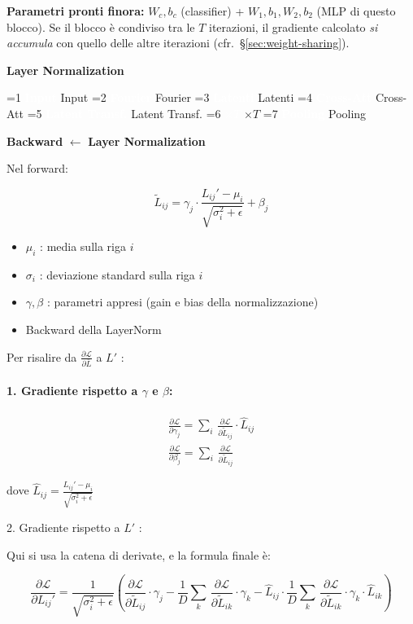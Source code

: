 \documentclass[
  11pt,
]{article}
\newcommand{\currentstep}[1]{%
\begin{tcolorbox}[colback=red!3, colframe=red!40!black, boxrule=0.3pt, arc=2pt,
  left=4pt, right=4pt, top=2pt, bottom=2pt]
{\footnotesize\textbf{Backward} $\longleftarrow$ \textbf{#1}}
\end{tcolorbox}}
\newcommand{\mystripchip}[3]{%
  \setlength{\fboxsep}{2.8pt}%
  \ifnum#3=#1\relax
    \colorbox{seccolor}{\textcolor{white}{\bfseries #2}}%
  \else
    \colorbox{seccolor!8}{\textcolor{seccolor!55}{#2}}%
  \fi}
\newcommand{\mystriparr}{{\fontsize{8}{8}\selectfont\;\textcolor{seccolor!45}{$\rightarrow$}\;}}
\newcommand{\mystrip}[1]{%
\begin{center}
{\sffamily\fontsize{7.5}{9}\selectfont
\mystripchip{1}{Input}{#1}\mystriparr\mystripchip{2}{Fourier}{#1}\mystriparr\mystripchip{3}{Latenti}{#1}\mystriparr%
\mystripchip{4}{Cross-Att}{#1}\mystriparr\mystripchip{5}{Latent Transf.}{#1}\mystriparr%
\mystripchip{6}{$\times T$}{#1}\mystriparr\mystripchip{7}{Pooling}{#1}}
\end{center}}
\renewcommand{\currentstep}[2][0]{%
\mystrip{#1}%
\begin{tcolorbox}[colback=red!3, colframe=red!40!black, boxrule=0.3pt, arc=2pt,
  left=4pt, right=4pt, top=2pt, bottom=2pt]
{\footnotesize\textbf{Backward} $\longleftarrow$ \textbf{#2}}
\end{tcolorbox}}
\begin{document}
\begin{notabox}[title={\textbf{Checkpoint gradienti --- fine MLP backward}}]
\medskip
\textbf{Parametri pronti finora:} $W_c, b_c$ (classifier) + $W_1, b_1, W_2, b_2$ (MLP di questo blocco). Se il blocco è condiviso tra le $T$ iterazioni, il gradiente calcolato \emph{si accumula} con quello delle altre iterazioni (cfr.\ \S\ref{sec:weight-sharing}).
\end{notabox}


\textbf{Layer Normalization}

\currentstep[5]{Layer Normalization}

Nel forward:

\[{\widetilde{L}}_{ij} = \gamma_{j} \cdot \frac{L_{ij}' - \mu_{i}}{\sqrt{\sigma_{i}^{2} + \epsilon}} + \beta_{j}\]

\begin{itemize}
\item
  \(\mu_{i}\) : media sulla riga \(i\)
\item
  \(\sigma_{i}\) : deviazione standard sulla riga \(i\)
\item
  \(\gamma,\beta\) : parametri appresi (gain e bias della
  normalizzazione)
\item
  Backward della LayerNorm
\end{itemize}

Per risalire da \(\frac{\partial\mathcal{L}}{\partial\bar{L}}\) a \(L'\)
:

\paragraph{1. Gradiente rispetto a $\gamma$ e $\beta$:}

\[\begin{matrix}
\frac{\partial\mathcal{L}}{\partial\gamma_{j}} = \sum_{i}^{}\,\frac{\partial\mathcal{L}}{\partial{\widetilde{L}}_{ij}} \cdot {\widehat{L}}_{ij} \\
\frac{\partial\mathcal{L}}{\partial\beta_{j}} = \sum_{i}^{}\,\frac{\partial\mathcal{L}}{\partial{\widetilde{L}}_{ij}}
\end{matrix}\]

dove
\({\widehat{L}}_{ij} = \frac{L_{ij}' - \mu_{i}}{\sqrt{\sigma_{i}^{2} + \epsilon}}\)

2. Gradiente rispetto a \(L'\) :

Qui si usa la catena di derivate, e la formula finale è:

\[\frac{\partial\mathcal{L}}{\partial L_{ij}'} = \frac{1}{\sqrt{\sigma_{i}^{2} + \epsilon}}\left( \frac{\partial\mathcal{L}}{\partial{\widetilde{L}}_{ij}} \cdot \gamma_{j} - \frac{1}{D}\sum_{k}^{}\,\frac{\partial\mathcal{L}}{\partial{\widetilde{L}}_{ik}} \cdot \gamma_{k} - {\widehat{L}}_{ij} \cdot \frac{1}{D}\sum_{k}^{}\,\frac{\partial\mathcal{L}}{\partial{\widetilde{L}}_{ik}} \cdot \gamma_{k} \cdot {\widehat{L}}_{ik} \right)\]
\end{document}
